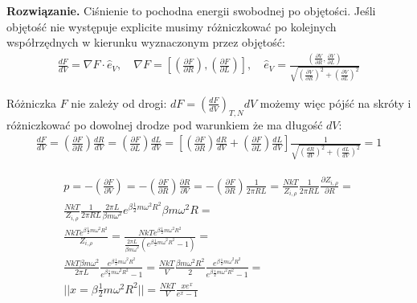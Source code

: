 \documentclass[11pt,a4paper]{article}
\newenvironment{solution}{\vspace{1cm} \par\textbf{Rozwiązanie.} \vspace{1cm}}{}
\begin{document}
\begin{solution}
Ciśnienie to pochodna energii swobodnej po objętości. 
Jeśli objętość nie występuje explicite musimy różniczkować
po kolejnych współrzędnych w kierunku wyznaczonym przez objętość:
\begin{align*}
  \frac{dF}{dV} =  \nabla F \cdot \hat{e}_{V}, \quad 
  \nabla F = \left[\left( \frac{\partial F}{\partial R} \right), 
              \left( \frac{\partial F}{\partial L} \right) \right], \quad
\hat{e}_{V} = \frac{\left( \frac{\partial V}{\partial R}, \frac{\partial V}{\partial L} \right)}{\sqrt{\left(\frac{\partial V}{\partial R}\right)^2 + \left(\frac{\partial V}{\partial L}\right)^2}} 
\end{align*}

Różniczka $F$ nie zależy od drogi: 
$dF = \left( \frac{d F}{d V} \right)_{T,N} dV $
możemy więc pójść na skróty i różniczkować po dowolnej drodze
pod warunkiem że ma długość $dV$:
\begin{align*}
  \frac{dF}{dV} = \left( \frac{\partial F}{\partial R} \right) \frac{dR}{dV} =
       \left( \frac{\partial F}{\partial L} \right) \frac{dL}{dV} = 
       \left[\left( \frac{\partial F}{\partial R} \right) \frac{dR}{dV}  + 
       \left( \frac{\partial F}{\partial L} \right) \frac{dL}{dV} \right] \frac{1}{\sqrt{\left(\frac{dR}{dV}\right)^2 + \left(\frac{dL}{dV}\right)^2}} = 1
\end{align*} 

\begin{align*}
  p = -\left( \frac{\partial F}{\partial V} \right) =
  -\left( \frac{\partial F}{\partial R} \right) \frac{\partial R}{\partial V} = 
  -\left(\frac{\partial F}{\partial R} \right) \frac{1}{2\pi R L} = 
  \frac{NkT}{Z_{i,\rho}} \frac{1}{2\pi R L} \frac{\partial Z_{i,\rho}}{\partial R} = \\
   \frac{NkT}{Z_{i,\rho}} \frac{1}{2\pi R L} \frac{2\pi L}{\beta m \omega^2} e^{\beta \frac{1}{2} m \omega^2 R^2} \beta m \omega^2 R = \\
  \frac{NkT e^{\beta \frac{1}{2} m \omega^2 R^2}}{Z_{i,\rho}} = 
  \frac{NkT e^{\beta \frac{1}{2} m \omega^2 R^2}}{\frac{2\pi L}{\beta m \omega^2} \left(e^{\beta \frac{1}{2} m \omega^2 R^2}-1\right)} = \\
  \frac{NkT \beta m \omega^2}{2\pi L} \frac{e^{\beta \frac{1}{2} m \omega^2 R^2}}{e^{\beta \frac{1}{2} m \omega^2 R^2}-1} =
  \frac{NkT}{V} \frac{\beta m\omega^{2}R^{2}}{2} \frac{e^{\beta \frac{1}{2} m \omega^2 R^2}}{e^{\beta \frac{1}{2} m \omega^2 R^2}-1} = \\
  || x = \beta \frac{1}{2} m \omega^2 R^2 || =
  \frac{NkT}{V} \frac{x e^{x}}{e^{x}-1}
\end{align*}


\end{solution}
\end{document}
